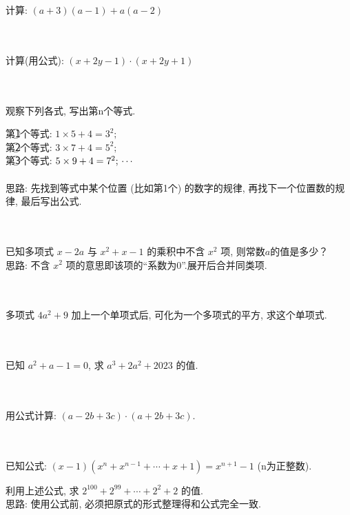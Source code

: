 \item{
    计算: $(a+3)(a-1) + a(a-2)$
}
\\ \\ \\

\item{
    计算(用公式): $(x+2y-1)\cdot (x+2y+1)$
}
\\ \\ \\

\item{
    观察下列各式, 写出第n个等式.

    第\textcircled{1}个等式: $1\times 5 + 4 = 3^2;$ \\
    第\textcircled{2}个等式: $3\times 7 + 4 = 5^2;$ \\
    第\textcircled{3}个等式: $5\times 9 + 4 = 7^2; \\ \cdots $ \\
    \ifshowSolution
    \fangsong{}
    \\
    思路: 先找到等式中某个位置 (比如第1个) 的数字的规律, 再找下一个位置数的规律, 最后写出公式.
    \fi
    \unless\ifshowSolution
    \\ \\ \\
    \fi
}

\item{
    已知多项式 $x-2a$ 与 $x^2+x-1$ 的乘积中不含 $x^2$ 项, 则常数$a$的值是多少？
    \ifshowSolution
    \fangsong{}
    \\
    思路: 不含 $x^2$ 项的意思即该项的“系数为0”.展开后合并同类项.
    \fi
}
\\ \\ \\

\item{
    多项式 $4a^2+9$ 加上一个单项式后, 可化为一个多项式的平方, 求这个单项式.
}
\\ \\ \\

\item{
    已知 $a^2+a-1=0$, 求 $a^3 + 2a^2 + 2023$ 的值.
}
\\ \\ \\

\item{
    用公式计算: $(a-2b+3c)\cdot (a+2b+3c)$.
}
\\ \\ \\

\item{
    已知公式: $(x-1)(x^n + x^{n-1} + \cdots + x + 1) = x^{n+1} - 1$ (n为正整数).
    
    利用上述公式, 求 $2^{100} + 2^{99} +\cdots + 2^2 + 2$ 的值.
    \ifshowSolution
    \fangsong{}
    \\
    思路: 使用公式前, 必须把原式的形式整理得和公式完全一致.
    \fi
    \unless\ifshowSolution
    \\ \\ \\
    \fi
}